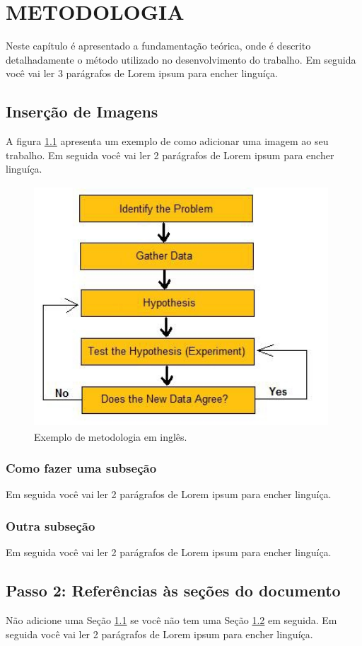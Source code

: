 \newpage
\chapter{METODOLOGIA}\label{cap:metodo}
Neste capítulo é apresentado a fundamentação teórica, onde é descrito detalhadamente o método utilizado no desenvolvimento do  trabalho. Em seguida você vai ler 3 parágrafos de Lorem ipsum para encher linguíça.

\lipsum[3-5]



\section{Inserção de Imagens} \label{sec:imagens}
A figura \ref{fig:metodo} apresenta um exemplo de como adicionar uma imagem ao seu trabalho. Em seguida você vai ler 2 parágrafos de Lorem ipsum para encher linguíça.

\lipsum[2-4]


\begin{figure}[H]
\centering
\includegraphics[width=11cm, height =9cm]{images/The_Scientific_Method.jpg}
\caption{Exemplo de metodologia em inglês.}
\label{fig:metodo}
\end{figure}

\subsection{Como fazer uma subseção}
Em seguida você vai ler 2 parágrafos de Lorem ipsum para encher linguíça.

\lipsum[2-4]
\subsection{Outra subseção}
Em seguida você vai ler 2 parágrafos de Lorem ipsum para encher linguíça.

\lipsum[2-4]
\section{Passo 2: Referências às seções do documento}\label{sec:refs}

Não adicione uma Seção \ref{sec:imagens} se você não tem uma Seção \ref{sec:refs} em seguida.  Em seguida você vai ler 2 parágrafos de Lorem ipsum para encher linguíça.

\lipsum[2-4]


